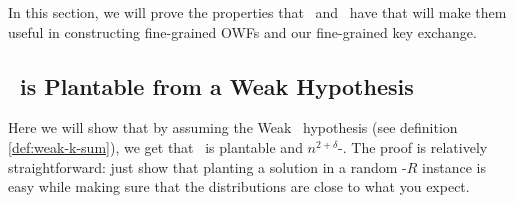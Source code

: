 
In this section, we will prove the properties that \kSum~and \zkclique~have that will make them useful in constructing fine-grained OWFs and our fine-grained key exchange.

\subsection{\kSum~is Plantable from a Weak Hypothesis}
Here we will show that by assuming the Weak \kSum~hypothesis (see definition \ref{def:weak-k-sum}), we get that \kSum~is plantable and $n^{2+\delta}$-\ACIH. The proof is relatively straightforward: just show that planting a solution in a random \kSum-$R$ instance is easy while making sure that the distributions are close to what you expect.

